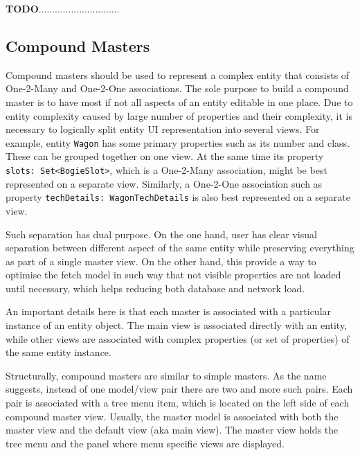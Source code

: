   \textbf{TODO}..............................
  
\subsection{Compound Masters}

  Compound masters should be used to represent a complex entity that consists of One-2-Many and One-2-One associations.
  The sole purpose to build a compound master is to have most if not all aspects of an entity editable in one place.
  Due to entity complexity caused by large number of properties and their complexity, it is necessary to logically split entity UI representation into several views.
  For example, entity \texttt{Wagon} has some primary properties such as its number and class.
  These can be grouped together on one view.
  At the same time its property \texttt{slots: Set<BogieSlot>}, which is a One-2-Many association, might be best represented on a separate view.
  Similarly, a One-2-One association such as property \texttt{techDetails: WagonTechDetails} is also best represented on a separate view.
  
  Such separation has dual purpose.
  On the one hand, user has clear visual separation between different aspect of the same entity while preserving everything as part of a single master view.
  On the other hand, this provide a way to optimise the fetch model in such way that not visible properties are not loaded until necessary, which helps reducing both database and network load.
  
  An important details here is that each master is associated with a particular instance of an entity object.
  The main view is associated directly with an entity, while other views are associated with complex properties (or set of properties) of the same entity instance.
  
  Structurally, compound masters are similar to simple masters.
  As the name suggests, instead of one model/view pair there are two and more such pairs.
  Each pair is associated with a tree menu item, which is located on the left side of each compound master view.
  Usually, the master model is associated with both the master view and the default view (aka main view).
  The master view holds the tree menu and the panel where menu specific views are displayed.
  



